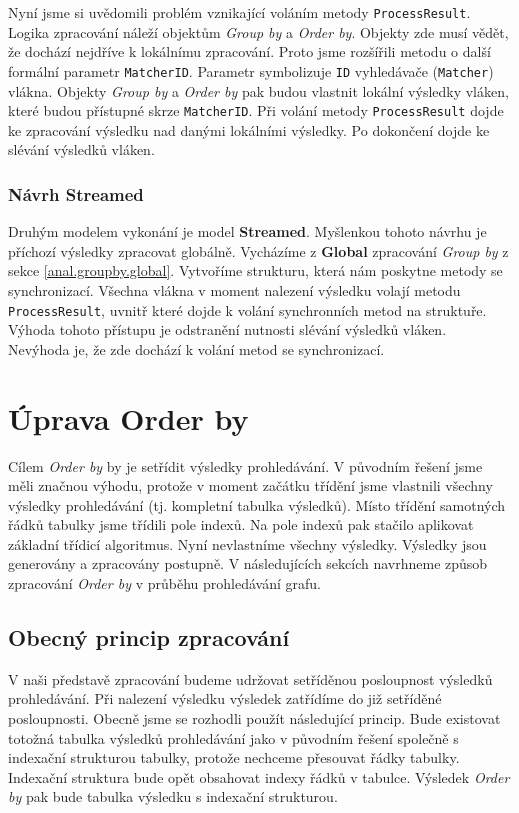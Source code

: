 Nyní jsme si uvědomili problém vznikající voláním metody \texttt{ProcessResult}.
Logika zpracování náleží objektům \textit{Group by} a \textit{Order by}.
Objekty zde musí vědět, že dochází nejdříve k lokálnímu zpracování.
Proto jsme rozšířili metodu o další formální parametr \texttt{MatcherID}.
Parametr symbolizuje \texttt{ID} vyhledávače (\texttt{Matcher}) vlákna.
Objekty \textit{Group by} a \textit{Order by} pak budou vlastnit lokální výsledky vláken, které budou přístupné skrze \texttt{MatcherID}.
Při volání metody \texttt{ProcessResult} dojde ke zpracování výsledku nad danými lokálními výsledky.
Po dokončení dojde ke slévání výsledků vláken.

\subsubsection{Návrh Streamed}

Druhým modelem vykonání je model \textbf{Streamed}.
Myšlenkou tohoto návrhu je příchozí výsledky zpracovat globálně.
Vycházíme z \textbf{Global} zpracování \textit{Group by} z sekce \ref{anal.groupby.global}.
Vytvoříme strukturu, která nám poskytne metody se synchronizací.
Všechna vlákna v moment nalezení výsledku volají metodu \texttt{ProcessResult}, uvnitř které dojde k volání synchronních metod na struktuře.
Výhoda tohoto přístupu je odstranění nutnosti slévání výsledků vláken.
Nevýhoda je, že zde dochází k volání metod se synchronizací.

\section{Úprava Order by} \label{anal.improvement.orderby}

Cílem \textit{Order by} by je setřídit výsledky prohledávání.
V původním řešení jsme měli značnou výhodu, protože v moment začátku třídění jsme vlastnili všechny výsledky prohledávání (tj. kompletní tabulka výsledků).
Místo třídění samotných řádků tabulky jsme třídili pole indexů.
Na pole indexů pak stačilo aplikovat základní třídicí algoritmus.
Nyní nevlastníme všechny výsledky.
Výsledky jsou generovány a zpracovány postupně.
V následujících sekcích navrhneme způsob zpracování \textit{Order by} v průběhu prohledávání grafu.

\subsection{Obecný princip zpracování}

V naši představě zpracování budeme udržovat setříděnou posloupnost výsledků prohledávání.
Při nalezení výsledku výsledek zatřídíme do již setříděné posloupnosti.
Obecně jsme se rozhodli použít následující princip.
Bude existovat totožná tabulka výsledků prohledávání jako v původním řešení společně s indexační strukturou tabulky, protože nechceme přesouvat řádky tabulky.
Indexační struktura bude opět obsahovat indexy řádků v tabulce.
Výsledek \textit{Order by} pak bude tabulka výsledku s indexační strukturou.

